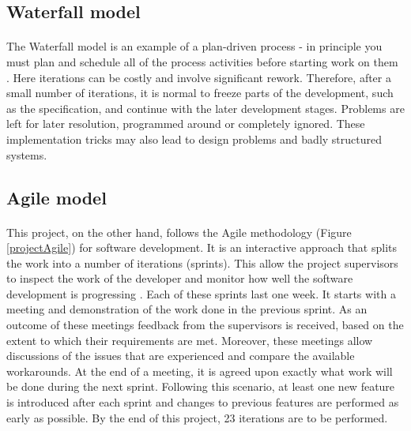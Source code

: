 \documentclass{l4proj}
\begin{document}
\subsection{Waterfall model}
\paragraph{}
The Waterfall model is an example of a plan-driven process - in principle you must plan and schedule all of the process activities before starting work on them \cite{sene}. Here iterations can be costly and involve significant rework. Therefore, after a small number of iterations, it is normal to freeze parts of the development, such as the specification, and continue with the later development stages. Problems are left for later resolution, programmed around or completely ignored. These implementation tricks may also lead to design problems and badly structured systems.

\subsection{Agile model}
\paragraph{}
This project, on the other hand, follows the Agile methodology (Figure \ref{projectAgile}) for software development. It is an interactive
approach that splits the work into a number of iterations (sprints). This allow the project supervisors to inspect the work of the developer and monitor how well the software development is progressing \cite{sene}. Each of these sprints last one
week. It starts with a meeting and demonstration of the work done in the previous sprint. As an
outcome of these meetings feedback from the supervisors is received, based on the
extent to which their requirements are met. Moreover, these meetings allow discussions of the issues
that are experienced and compare the available workarounds. At the end of a meeting, it is agreed
upon exactly what work will be done during the next sprint. Following this scenario, at least one new
feature is introduced after each sprint and changes to previous features are performed as early as possible. By the end of this project, 23 iterations are to be performed.
\end{document}
